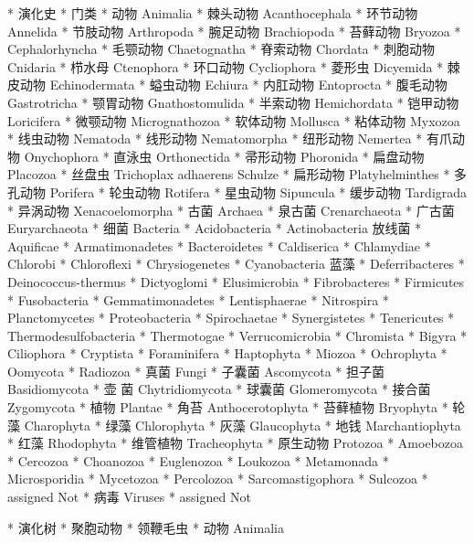 * 演化史
	* 门类
		* 动物 Animalia
			* 棘头动物 Acanthocephala
			* 环节动物 Annelida
			* 节肢动物 Arthropoda
			* 腕足动物 Brachiopoda
			* 苔藓动物 Bryozoa
			*		   Cephalorhyncha
			* 毛颚动物 Chaetognatha
			* 脊索动物 Chordata
			* 刺胞动物 Cnidaria
			* 栉水母   Ctenophora
			* 环口动物 Cycliophora
			* 菱形虫   Dicyemida
			* 棘皮动物 Echinodermata
			* 螠虫动物 Echiura
			* 内肛动物 Entoprocta
			* 腹毛动物 Gastrotricha
			* 颚胃动物 Gnathostomulida
			* 半索动物 Hemichordata
			* 铠甲动物 Loricifera
			* 微颚动物 Micrognathozoa
			* 软体动物 Mollusca
			* 粘体动物 Myxozoa
			* 线虫动物 Nematoda
			* 线形动物 Nematomorpha
			* 纽形动物 Nemertea
			* 有爪动物 Onychophora
			* 直泳虫 Orthonectida
			* 帚形动物 Phoronida
			* 扁盘动物 Placozoa
				* 丝盘虫 Trichoplax adhaerens Schulze
			* 扁形动物 Platyhelminthes
			* 多孔动物 Porifera
			* 轮虫动物 Rotifera
			* 星虫动物 Sipuncula
			* 缓步动物 Tardigrada
			* 异涡动物 Xenacoelomorpha
		* 古菌 Archaea
			* 泉古菌 Crenarchaeota
			* 广古菌 Euryarchaeota
		* 细菌 Bacteria
			* Acidobacteria
			* Actinobacteria 放线菌
			* Aquificae
			* Armatimonadetes
			* Bacteroidetes
			* Caldiserica
			* Chlamydiae
			* Chlorobi
			* Chloroflexi
			* Chrysiogenetes
			* Cyanobacteria 蓝藻
			* Deferribacteres
			* Deinococcus-thermus
			* Dictyoglomi
			* Elusimicrobia
			* Fibrobacteres
			* Firmicutes
			* Fusobacteria
			* Gemmatimonadetes
			* Lentisphaerae
			* Nitrospira
			* Planctomycetes
			* Proteobacteria
			* Spirochaetae
			* Synergistetes
			* Tenericutes
			* Thermodesulfobacteria
			* Thermotogae
			* Verrucomicrobia
		* Chromista
			* Bigyra
			* Ciliophora
			* Cryptista
			* Foraminifera
			* Haptophyta
			* Miozoa
			* Ochrophyta
			* Oomycota
			* Radiozoa
		* 真菌 Fungi
			* 子囊菌 Ascomycota
			* 担子菌 Basidiomycota
			* 壶  菌 Chytridiomycota
			* 球囊菌 Glomeromycota
			* 接合菌 Zygomycota
		* 植物 Plantae
			* 角苔	 Anthocerotophyta
			* 苔藓植物 Bryophyta
			* 轮藻	 Charophyta
			* 绿藻	 Chlorophyta
			* 灰藻	 Glaucophyta
			* 地钱	 Marchantiophyta
			* 红藻	 Rhodophyta
			* 维管植物 Tracheophyta
		* 原生动物 Protozoa
			* Amoebozoa
			* Cercozoa
			* Choanozoa
			* Euglenozoa
			* Loukozoa
			* Metamonada
			* Microsporidia
			* Mycetozoa
			* Percolozoa
			* Sarcomastigophora
			* Sulcozoa
			* assigned Not
		* 病毒 Viruses
			* assigned Not


	* 演化树
		* 聚胞动物
			* 领鞭毛虫
			* 动物 Animalia

